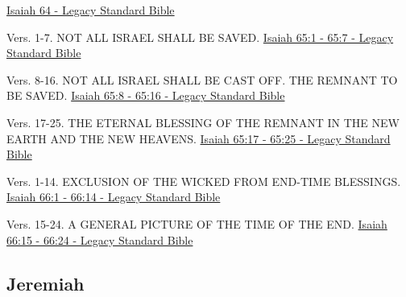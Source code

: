\documentclass[
  ignorenonframetext,
]{beamer}
\begin{document}
\begin{frame}{64}
\label{section-72}
\href{https://read.lsbible.org/?q=isa64}{Isaiah 64 - Legacy Standard
Bible}
\end{frame}

\begin{frame}{65}
\label{section-73}
\begin{block}{Vers. 1-7. NOT ALL ISRAEL SHALL BE SAVED.}
\label{vers.-1-7.-not-all-israel-shall-be-saved.}
\href{https://read.lsbible.org/?q=isa65\%3A1-7}{Isaiah 65:1 - 65:7 -
Legacy Standard Bible}
\end{block}

\begin{block}{Vers. 8-16. NOT ALL ISRAEL SHALL BE CAST OFF. THE REMNANT
TO BE SAVED.}
\label{vers.-8-16.-not-all-israel-shall-be-cast-off.-the-remnant-to-be-saved.}
\href{https://read.lsbible.org/?q=isa65\%3A8-16}{Isaiah 65:8 - 65:16 -
Legacy Standard Bible}
\end{block}

\begin{block}{Vers. 17-25. THE ETERNAL BLESSING OF THE REMNANT IN THE
NEW EARTH AND THE NEW HEAVENS.}
\label{vers.-17-25.-the-eternal-blessing-of-the-remnant-in-the-new-earth-and-the-new-heavens.}
\href{https://read.lsbible.org/?q=isa65\%3A17-25}{Isaiah 65:17 - 65:25 -
Legacy Standard Bible}
\end{block}
\end{frame}

\begin{frame}{66}
\label{section-74}
\begin{block}{Vers. 1-14. EXCLUSION OF THE WICKED FROM END-TIME
BLESSINGS.}
\label{vers.-1-14.-exclusion-of-the-wicked-from-end-time-blessings.}
\href{https://read.lsbible.org/?q=isa66\%3A1-14}{Isaiah 66:1 - 66:14 -
Legacy Standard Bible}
\end{block}

\begin{block}{Vers. 15-24. A GENERAL PICTURE OF THE TIME OF THE END.}
\label{vers.-15-24.-a-general-picture-of-the-time-of-the-end.}
\href{https://read.lsbible.org/?q=isa66\%3A15-24}{Isaiah 66:15 - 66:24 -
Legacy Standard Bible}
\end{block}
\end{frame}

\subsection{Jeremiah}\label{jeremiah}
\end{document}
